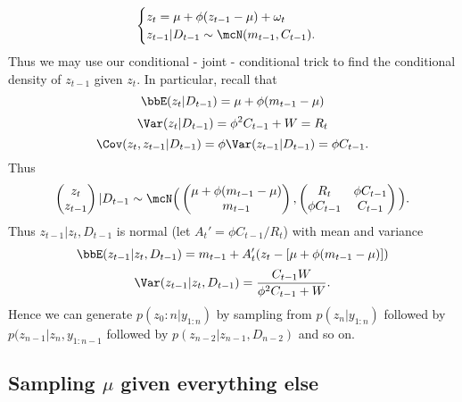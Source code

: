 \documentclass{article}
\begin{document}
\[
\begin{cases}
z_t = \mu + \phi(z_{t-1} - \mu) + \omega_t \\
z_{t-1} | D_{t-1} \sim \mcN(m_{t-1}, C_{t-1}).
\end{cases}
\]
Thus we may use our conditional - joint - conditional trick to find the conditional density of $z_{t-1}$ given $z_t$.  In particular, recall that
\[
\bbE(z_t | D_{t-1}) = \mu + \phi (m_{t-1} - \mu)
\]
\[
\Var(z_t | D_{t-1}) = \phi^2 C_{t-1} + W = R_t
\]
\[
\Cov(z_t, z_{t-1} | D_{t-1}) = \phi \Var(z_{t-1} | D_{t-1}) = \phi C_{t-1}.
\]
Thus
\[
\begin{pmatrix}
z_t \\
z_{t-1}
\end{pmatrix} | D_{t-1} 
\sim
\mcN
\Big(
\begin{pmatrix}
\mu + \phi (m_{t-1} - \mu)  \\
m_{t-1}
\end{pmatrix} ,
\begin{pmatrix}
R_t & \phi C_{t-1} \\
\phi C_{t-1} & C_{t-1}
\end{pmatrix}
\Big).
\]
Thus $z_{t-1} | z_t , D_{t-1}$ is normal (let $A_t' = \phi C_{t-1} / R_t$) with mean and variance
\[
\bbE (z_{t-1} | z_{t}, D_{t-1}) = m_{t-1} + A_t' (z_t - [\mu + \phi (m_{t-1} - \mu)] )
\]
\[
\Var(z_{t-1} | z_{t}, D_{t-1}) = \frac{C_{t-1} W}{\phi^2 C_{t-1} + W}.
\]
Hence we can generate $p(z_0:n | y_{1:n})$ by sampling from $p(z_n | y_{1:n})$ followed by $p(z_{n-1} | z_n, y_{1:n-1}$ followed by $p(z_{n-2} | z_{n-1}, D_{n-2})$ and so on.

\subsection{Sampling $\mu$ given everything else}
\end{document}
